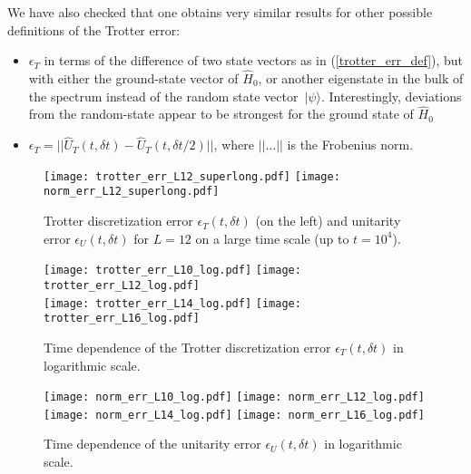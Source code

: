 \documentclass[10pt,amsmath,amssymb,twocolumn,superscriptaddress,groupedaddress,nofootinbib,aps,prd,twocolumn]{revtex4-1}
\newcommand{\lr}[1]{\left(#1\right)}
\newcommand{\ket}[1]{ \, | #1 \rangle }
\begin{document}
We have also checked that one obtains very similar results for other possible definitions of the Trotter error: 
\begin{itemize}
 \item $\epsilon_T$ in terms of the difference of two state vectors as in (\ref{trotter_err_def}), but with either the ground-state vector of $\hat{H}_0$, or another eigenstate in the bulk of the spectrum instead of the random state vector $\ket{\psi}$. Interestingly, deviations from the random-state appear to be strongest for the ground state of $\hat{H}_0$
 \item $\epsilon_T = || \hat{U}_T\lr{t, {\delta} t} - \hat{U}_T\lr{t, {\delta} t/2} ||$, where $||\ldots||$ is the Frobenius norm.
\end{itemize}

\begin{figure*}[h!pb]
  \centering
  \texttt{[image: trotter\_err\_L12\_superlong.pdf]}
  \texttt{[image: norm\_err\_L12\_superlong.pdf]}\\
  \caption{Trotter discretization error $\epsilon_T\lr{t, {\delta t}}$ (on the left) and unitarity error $\epsilon_U\lr{t, {\delta} t}$ for $L=12$ on a large time scale (up to $t = 10^4$).}
  \label{fig:trotter_err_superlong}
\end{figure*}

\begin{figure*}[h!pb]
  \centering
  \texttt{[image: trotter\_err\_L10\_log.pdf]}
  \texttt{[image: trotter\_err\_L12\_log.pdf]}\\
  \texttt{[image: trotter\_err\_L14\_log.pdf]}
  \texttt{[image: trotter\_err\_L16\_log.pdf]}\\
  \caption{Time dependence of the Trotter discretization error $\epsilon_T\lr{t, {\delta t}}$ in logarithmic scale.}
  \label{fig:trotter_err_logscale}
\end{figure*}

\begin{figure*}[h!pb]
  \centering
  \texttt{[image: norm\_err\_L10\_log.pdf]}
  \texttt{[image: norm\_err\_L12\_log.pdf]}\\
  \texttt{[image: norm\_err\_L14\_log.pdf]}
  \texttt{[image: norm\_err\_L16\_log.pdf]}\\
  \caption{Time dependence of the unitarity error $\epsilon_U\lr{t, {\delta t}}$ in logarithmic scale.}
  \label{fig:norm_err_logscale}
\end{figure*}



\end{document}

